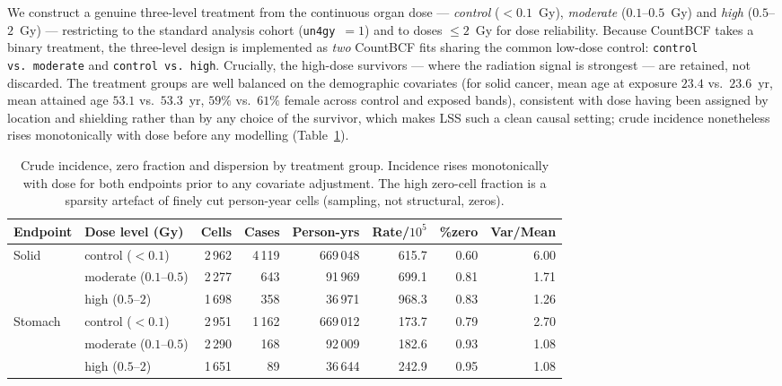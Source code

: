 \documentclass[11pt]{article}
\begin{document}
We construct a genuine three-level treatment from the continuous organ dose
--- \emph{control} ($<0.1$~Gy), \emph{moderate} ($0.1$--$0.5$~Gy) and
\emph{high} ($0.5$--$2$~Gy) --- restricting to the standard analysis cohort
(\texttt{un4gy}~$=1$) and to doses $\leq 2$~Gy for dose reliability. Because
CountBCF takes a binary treatment, the three-level design is implemented as
\emph{two} CountBCF fits sharing the common low-dose control:
\texttt{control vs.\ moderate} and \texttt{control vs.\ high}. Crucially,
the high-dose survivors --- where the radiation signal is strongest --- are
retained, not discarded. The treatment groups are well balanced on the
demographic covariates (for solid cancer, mean age at exposure $23.4$ vs.\
$23.6$~yr, mean attained age $53.1$ vs.\ $53.3$~yr, $59\%$ vs.\ $61\%$
female across control and exposed bands), consistent with dose having been
assigned by location and shielding rather than by any choice of the survivor,
which makes LSS such a clean causal setting; crude incidence
nonetheless rises monotonically with dose before any modelling
(Table~\ref{tab:applied-baseline}).

\begin{table}[htbp]
\centering
\caption{Crude incidence, zero fraction and dispersion by treatment group.
Incidence rises monotonically with dose for both endpoints prior to any
covariate adjustment. The high zero-cell fraction is a sparsity artefact of
finely cut person-year cells (sampling, not structural, zeros).}
\label{tab:applied-baseline}
\small
\begin{tabular}{llrrrrrr}
\toprule
Endpoint & Dose level (Gy) & Cells & Cases & Person-yrs & Rate/$10^5$ & \%zero & Var/Mean \\
\midrule
Solid   & control ($<0.1$)   & 2\,962 & 4\,119 & 669\,048 & 615.7 & 0.60 & 6.00 \\
        & moderate ($0.1$--$0.5$) & 2\,277 &   643 &  91\,969 & 699.1 & 0.81 & 1.71 \\
        & high ($0.5$--$2$)  & 1\,698 &   358 &  36\,971 & 968.3 & 0.83 & 1.26 \\
\midrule
Stomach & control ($<0.1$)   & 2\,951 & 1\,162 & 669\,012 & 173.7 & 0.79 & 2.70 \\
        & moderate ($0.1$--$0.5$) & 2\,290 &   168 &  92\,009 & 182.6 & 0.93 & 1.08 \\
        & high ($0.5$--$2$)  & 1\,651 &    89 &  36\,644 & 242.9 & 0.95 & 1.08 \\
\bottomrule
\end{tabular}
\end{table}
\end{document}
